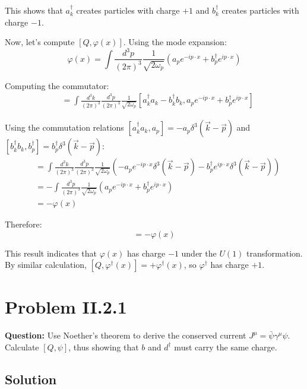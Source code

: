 \documentclass[12pt]{article}
\begin{document}
This shows that $a_k^\dagger$ creates particles with charge $+1$ and $b_k^\dagger$ creates particles with charge $-1$.

Now, let's compute $[Q, \varphi(x)]$. Using the mode expansion:
\begin{equation}
\varphi(x) = \int \frac{d^3p}{(2\pi)^3} \frac{1}{\sqrt{2\omega_p}} \left( a_p e^{-ip\cdot x} + b_p^\dagger e^{ip\cdot x} \right)
\end{equation}

Computing the commutator:
\begin{align}
[Q, \varphi(x)] &= \int \frac{d^3k}{(2\pi)^3} \frac{d^3p}{(2\pi)^3} \frac{1}{\sqrt{2\omega_p}} [a_k^\dagger a_k - b_k^\dagger b_k, a_p e^{-ip\cdot x} + b_p^\dagger e^{ip\cdot x}]
\end{align}

Using the commutation relations $[a_k^\dagger a_k, a_p] = -a_p \delta^3(\vec{k}-\vec{p})$ and $[b_k^\dagger b_k, b_p^\dagger] = b_p^\dagger \delta^3(\vec{k}-\vec{p})$:
\begin{align}
[Q, \varphi(x)] &= \int \frac{d^3k}{(2\pi)^3} \frac{d^3p}{(2\pi)^3} \frac{1}{\sqrt{2\omega_p}} \left( -a_p e^{-ip\cdot x} \delta^3(\vec{k}-\vec{p}) - b_p^\dagger e^{ip\cdot x} \delta^3(\vec{k}-\vec{p}) \right) \\
&= -\int \frac{d^3p}{(2\pi)^3} \frac{1}{\sqrt{2\omega_p}} \left( a_p e^{-ip\cdot x} + b_p^\dagger e^{ip\cdot x} \right) \\
&= -\varphi(x)
\end{align}

Therefore:
\begin{equation}
[Q, \varphi(x)] = -\varphi(x)
\end{equation}

This result indicates that $\varphi(x)$ has charge $-1$ under the $U(1)$ transformation. By similar calculation, $[Q, \varphi^\dagger(x)] = +\varphi^\dagger(x)$, so $\varphi^\dagger$ has charge $+1$.

\section*{Problem II.2.1}
\textbf{Question:} Use Noether's theorem to derive the conserved current $J^\mu = \bar{\psi}\gamma^\mu\psi$. Calculate $[Q, \psi]$, thus showing that $b$ and $d^\dagger$ must carry the same charge.

\subsection*{Solution}
\end{document}

